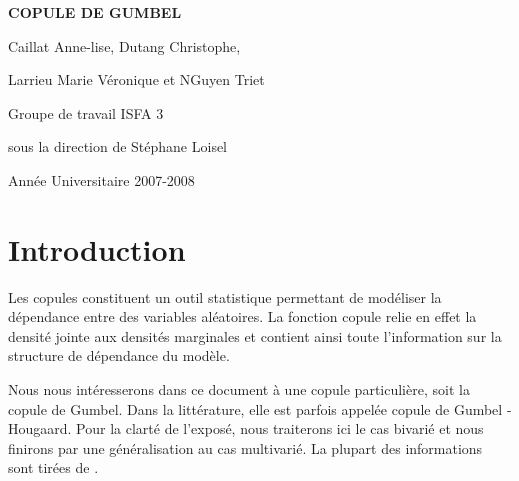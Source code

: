 \documentclass[11pt]{article}
\begin{document}


\thispagestyle{empty}
 
\vspace{10cm}
\begin{center} {\huge \textbf{COPULE DE GUMBEL}} \end{center}
\vspace{5cm}
\begin{center} {\Large Caillat Anne-lise, Dutang Christophe,} \end{center}

\begin{center} {\Large Larrieu Marie V\'eronique et NGuyen Triet} \end{center}

\vspace{2cm}
\begin{center} {\large Groupe de travail ISFA 3} \end{center}

\begin{center} {\large sous la direction de St\'ephane Loisel} \end{center}
\vspace{1cm}
\begin{center} {\large Ann\'ee Universitaire 2007-2008} \end{center}


\newpage


\tableofcontents

\newpage

\section{Introduction}

Les copules constituent un outil statistique permettant de mod\'eliser la d\'e\-pen\-dance 
entre des variables al\'eatoires. La fonction copule relie en effet la densit\'e jointe aux 
densit\'es marginales et contient ainsi toute l'information sur la structure de d\'ependance du mod\`ele.

\medskip

Nous nous int\'eresserons dans ce document \`a une copule particuli\`ere, soit la copule de 
Gumbel. Dans la litt\'erature, elle est parfois appel\'ee copule de Gumbel - Hougaard. Pour la 
clart\'e de l'expos\'e, nous traiterons ici le cas bivari\'e et nous finirons par une g\'en\'eralisation 
au cas multivari\'e. La plupart des informations sont tir\'ees de \cite{nelsen}.

\medskip
\end{document}
